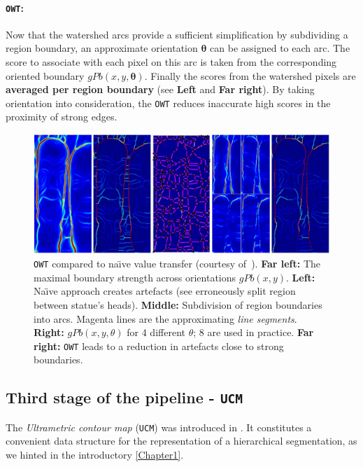 \paragraph{{\tt OWT}:}
Now that the watershed arcs provide a sufficient simplification by subdividing a region boundary, an approximate orientation $\mathbf\theta$ can be assigned to each arc. The score to associate with each pixel on this arc is taken from the corresponding oriented boundary $gPb(x,y,\mathbf{\theta})$. Finally the scores from the watershed pixels are {\bf averaged per region boundary} (see  {\bf Left} and {\bf Far right}). 
By taking orientation into consideration, the {\tt OWT} reduces inaccurate high scores in the proximity of strong edges.

\begin{figure}[t]
 \centering
 \includegraphics[width=1\textwidth]{images/gPb-OWT-UCM/OWT_Arbelaez11.png}
 \caption[{\tt OWT} compared to na\"{\i}ve value transfer]{{\tt OWT} compared to na\"{\i}ve value transfer (courtesy of~\cite{Arbelaez11}). {\bf Far left:} The maximal boundary strength across orientations $gPb(x,y)$. {\bf Left:} Na\"{\i}ve approach creates artefacts (see erroneously split region between statue's heads). {\bf Middle:} Subdivision of region boundaries into arcs. Magenta lines are the approximating {\it line segments}. {\bf Right:} $gPb(x,y,\theta)$ for 4 different $\theta$; 8 are used in practice. {\bf Far right:} {\tt OWT} leads to a reduction in artefacts close to strong boundaries.}
 \label{fig:OWT_Arbelaez11}
\end{figure}


\subsection{Third stage of the pipeline - {\tt UCM}}
\label{sec:ch3-UCM}
The {\it Ultrametric contour map} ({\tt UCM}) was introduced in \cite{Arbelaez2006boundary}. It constitutes a convenient data structure for the representation of a hierarchical segmentation, as we hinted in the introductory \cref{Chapter1}. 


